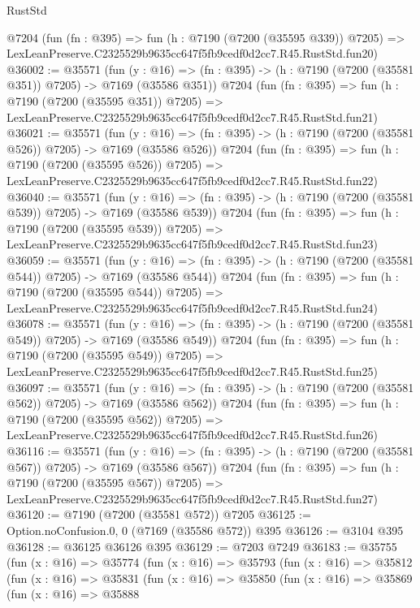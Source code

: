 \begin{lexlean}{RustStd}
\begin{coremodule}
    @7204
    (fun (fn : @395) =>
    fun (h : @7190 (@7200 (@35595 @339)) @7205) =>
    LexLeanPreserve.C2325529b9635cc647f5fb9cedf0d2cc7.R45.RustStd.fun20)
@36002 := @35571
    (fun (y : @16) => (fn : @395) -> (h : @7190 (@7200 (@35581 @351)) @7205) -> @7169 (@35586 @351))
    @7204
    (fun (fn : @395) =>
    fun (h : @7190 (@7200 (@35595 @351)) @7205) =>
    LexLeanPreserve.C2325529b9635cc647f5fb9cedf0d2cc7.R45.RustStd.fun21)
@36021 := @35571
    (fun (y : @16) => (fn : @395) -> (h : @7190 (@7200 (@35581 @526)) @7205) -> @7169 (@35586 @526))
    @7204
    (fun (fn : @395) =>
    fun (h : @7190 (@7200 (@35595 @526)) @7205) =>
    LexLeanPreserve.C2325529b9635cc647f5fb9cedf0d2cc7.R45.RustStd.fun22)
@36040 := @35571
    (fun (y : @16) => (fn : @395) -> (h : @7190 (@7200 (@35581 @539)) @7205) -> @7169 (@35586 @539))
    @7204
    (fun (fn : @395) =>
    fun (h : @7190 (@7200 (@35595 @539)) @7205) =>
    LexLeanPreserve.C2325529b9635cc647f5fb9cedf0d2cc7.R45.RustStd.fun23)
@36059 := @35571
    (fun (y : @16) => (fn : @395) -> (h : @7190 (@7200 (@35581 @544)) @7205) -> @7169 (@35586 @544))
    @7204
    (fun (fn : @395) =>
    fun (h : @7190 (@7200 (@35595 @544)) @7205) =>
    LexLeanPreserve.C2325529b9635cc647f5fb9cedf0d2cc7.R45.RustStd.fun24)
@36078 := @35571
    (fun (y : @16) => (fn : @395) -> (h : @7190 (@7200 (@35581 @549)) @7205) -> @7169 (@35586 @549))
    @7204
    (fun (fn : @395) =>
    fun (h : @7190 (@7200 (@35595 @549)) @7205) =>
    LexLeanPreserve.C2325529b9635cc647f5fb9cedf0d2cc7.R45.RustStd.fun25)
@36097 := @35571
    (fun (y : @16) => (fn : @395) -> (h : @7190 (@7200 (@35581 @562)) @7205) -> @7169 (@35586 @562))
    @7204
    (fun (fn : @395) =>
    fun (h : @7190 (@7200 (@35595 @562)) @7205) =>
    LexLeanPreserve.C2325529b9635cc647f5fb9cedf0d2cc7.R45.RustStd.fun26)
@36116 := @35571
    (fun (y : @16) => (fn : @395) -> (h : @7190 (@7200 (@35581 @567)) @7205) -> @7169 (@35586 @567))
    @7204
    (fun (fn : @395) =>
    fun (h : @7190 (@7200 (@35595 @567)) @7205) =>
    LexLeanPreserve.C2325529b9635cc647f5fb9cedf0d2cc7.R45.RustStd.fun27)
@36120 := @7190 (@7200 (@35581 @572)) @7205
@36125 := Option.noConfusion.{0, 0} (@7169 (@35586 @572)) @395
@36126 := @3104 @395
@36128 := @36125 @36126 @395
@36129 := @7203 @7249
@36183 := @35755
    (fun (x : @16) =>
    @35774
      (fun (x : @16) =>
      @35793
        (fun (x : @16) =>
        @35812
          (fun (x : @16) =>
          @35831
            (fun (x : @16) =>
            @35850
              (fun (x : @16) =>
              @35869
                (fun (x : @16) =>
                @35888

\end{coremodule}
\end{lexlean}
